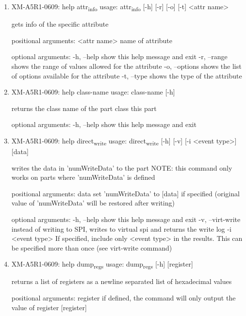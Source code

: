 \documentclass[11pt]{article}
\begin{document}
\begin{enumerate}
\item XM-A5R1-0609: help attr\textsubscript{info}
\label{sec:org4791a7d}
usage: attr\textsubscript{info} [-h] [-r] [-o] [-t] <attr name>

gets info of the specific attribute

positional arguments:
  <attr name>    name of attribute

optional arguments:
  -h, --help     show this help message and exit
  -r, --range    shows the range of values allowed for the attribute
  -o, --options  shows the list of options available for the attribute
  -t, --type     shows the type of the attribute

\item XM-A5R1-0609: help class-name
\label{sec:orgaacdb54}
usage: class-name [-h]

returns the class name of the part class this part

optional arguments:
  -h, --help  show this help message and exit

\item XM-A5R1-0609: help direct\textsubscript{write}
\label{sec:org8d441fa}
usage: direct\textsubscript{write} [-h] [-v] [-i <event type>] [data]

writes the data in 'numWriteData' to the part NOTE: this command only works on
parts where 'numWriteData' is defined

positional arguments:
  data              set 'numWriteData' to [data] if specified (original value
                    of 'numWriteData' will be restored after writing)

optional arguments:
  -h, --help        show this help message and exit
  -v, --virt-write  instead of writing to SPI, writes to virtual spi and
                    returns the write log
  -i <event type>   If specified, include only <event type> in the results.
                    This can be specified more than once (see virt-write
                    command)

\item XM-A5R1-0609: help dump\textsubscript{regs}
\label{sec:org8857694}
usage: dump\textsubscript{regs} [-h] [register]

returns a list of registers as a newline separated list of hexadecimal values

positional arguments:
  register    if defined, the command will only output the value of register
              [register]


\end{enumerate}
\end{document}
